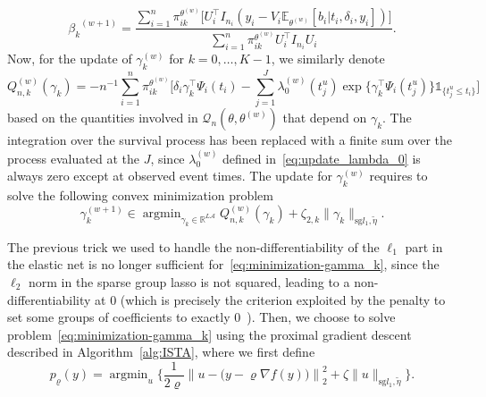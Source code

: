 \documentclass[11pt]{article}
\DeclareMathOperator{\argmin}{argmin}
\newcommand{\ind}[1]{\mathds{1}_{#1}}
\newcommand{\norm}[1]{\|#1\|}
\newcommand{\cA}{\mathcal A}
\newcommand{\cQ}{\mathcal Q}
\newcommand{\R}{\mathds R}
\newcommand{\E}{\mathds E}
\begin{document}
\begin{equation}
  \label{eq:update_beta}
  {\beta_k}^{(w+1)}= \dfrac{\sum_{i=1}^n \pi_{ik}^{\theta^{(w)}} \Big[U_i^\top I_{n_i} (y_i - V_i \E_{\theta^{(w)}}[ b_i | t_i, \delta_i, y_i])\Big]}{\sum_{i=1}^n \pi_{ik}^{\theta^{(w)}} U_i^\top I_{n_i} U_i}.
\end{equation}
Now, for the update of $\gamma_k^{(w)}$ for $k=0, \ldots, K-1$, we similarly denote
\[Q^{(w)}_{n,k}(\gamma_k) = -n^{-1} \sum_{i=1}^n \pi_{ik}^{\theta^{(w)}} \Big[\delta_i \gamma_k^\top \Psi_i(t_i) - \sum_{j=1}^J \lambda_0^{(w)}(t_j^u) \exp \big\{\gamma_k^\top \Psi_i(t_j^u)\big\} \ind{\{t_j^u \leq t_i\}} \Big]\]
based on the quantities involved in $\cQ_n(\theta, \theta^{(w)})$ that depend on $\gamma_k$. The integration over the survival process has been replaced with a finite sum over the process evaluated at the $J$, since $\lambda_0^{(w)}$ defined in~\eqref{eq:update_lambda_0} is always zero except at observed event times. The update for $\gamma_k^{(w)}$ requires to solve the following convex minimization problem
\begin{equation}
  \label{eq:minimization-gamma_k}
  \gamma_k^{(w+1)} \in \argmin_{\gamma_k \in \R^{L\cA}} Q^{(w)}_{n,k}(\gamma_k) + \zeta_{2,k} \norm{\gamma_k}_{\text{sg} l_1, \tilde{\eta}}.
\end{equation}

The previous trick we used to handle the non-differentiability of the $\ell_1$ part in the elastic net is no longer sufficient for~\eqref{eq:minimization-gamma_k}, since the $\ell_2$ norm in the sparse group lasso is not squared, leading to a non-differentiability at 0 (which is precisely the criterion exploited by the penalty to set some groups of coefficients to exactly 0~\citep{simon2013sparse}). Then, we choose to solve problem~\eqref{eq:minimization-gamma_k} using the proximal gradient descent~\citep{boyd2004convex} described in Algorithm~\ref{alg:ISTA}, where we first define
\[p_{\varrho}(y) = \argmin_u \Big\{\dfrac{1}{2\varrho} \left\lVert u - \big(y - \varrho  \nabla f(y) \big)\right\rVert_2^2 + \zeta \norm{u}_{\text{sg} l_1, \tilde{\eta}} \Big\}.\]

\vspace{.5cm}
\end{document}
